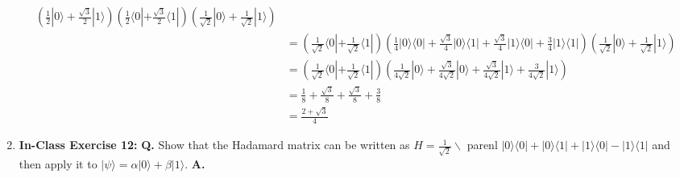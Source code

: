 \documentclass[main.tex]{subfiles}
\begin{document}
\begin{enumerate}
\begin{align*}
                                                                \left(\frac{1}{2}|0\rangle+\frac{\sqrt{3}}{2}|1\rangle\right)
                                                                \left(\frac{1}{2}\langle0|+\frac{\sqrt{3}}{2}\langle1|\right)
                                                                \left(\frac{1}{\sqrt{2}}|0\rangle + \frac{1}{\sqrt{2}} |1\rangle\right)\\
                                                                & = \left(\frac{1}{\sqrt{2}}\langle0| + \frac{1}{\sqrt{2}} \langle 1|\right)
                                                                \left(\frac{1}{4}|0\rangle\langle0| + \frac{\sqrt{3}}{4}|0\rangle\langle1| + 
                                                                \frac{\sqrt{3}}{4}|1\rangle\langle0| + \frac{3}{4}|1\rangle\langle1|\right)
                                                                \left(\frac{1}{\sqrt{2}}|0\rangle + \frac{1}{\sqrt{2}} |1\rangle\right)\\
                                                                & = \left(\frac{1}{\sqrt{2}}\langle0| + \frac{1}{\sqrt{2}} \langle 1|\right)
                                                                \left(\frac{1}{4\sqrt{2}}|0\rangle
                                                                + \frac{\sqrt{3}}{4\sqrt{2}}|0\rangle
                                                                + \frac{\sqrt{3}}{4\sqrt{2}}|1\rangle
                                                                + \frac{3}{4\sqrt{2}}|1\rangle\right)\\
                                                                & = \frac{1}{8} + \frac{\sqrt{3}}{8} + \frac{\sqrt{3}}{8} + \frac{3}{8}\\
                                                                & = \frac{2+\sqrt{3}}{4}
    \end{align*}

\item[] \textbf{In-Class Exercise 12:}  \textbf{Q.} Show that the Hadamard matrix can be written as $H=\frac{1}{\sqrt{2}} \backslash$ parenl $|0\rangle\langle 0|+| 0\rangle\langle 1|+| 1\rangle\langle 0|-| 1\rangle\langle 1|$ and then apply it to $|\psi\rangle=\alpha|0\rangle+\beta|1\rangle .$  \textbf{A.}

\end{enumerate}
\end{document}

